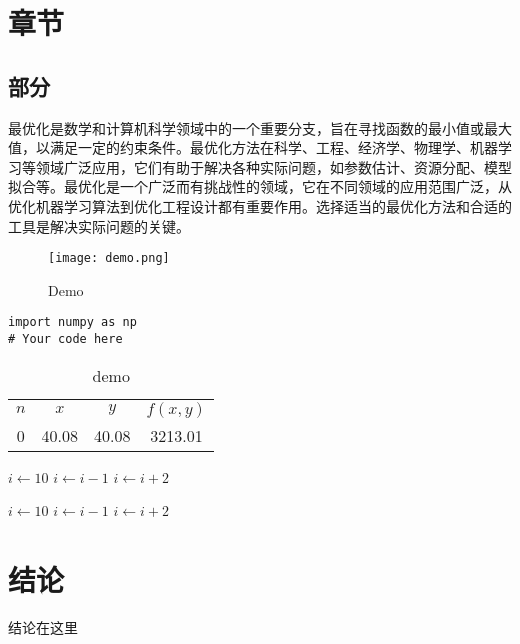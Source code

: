 
\iffalse
\fi

\chapter{章节}

\section{部分}

最优化\cite{optim}是数学和计算机科学领域中的一个重要分支，旨在寻找函数的最小值或最大值，以满足一定的约束条件。最优化方法在科学、工程、经济学、物理学、机器学习等领域广泛应用，它们有助于解决各种实际问题，如参数估计、资源分配、模型拟合等。最优化是一个广泛而有挑战性的领域，它在不同领域的应用范围广泛，从优化机器学习算法到优化工程设计都有重要作用。选择适当的最优化方法和合适的工具是解决实际问题的关键。

\begin{figure}[H]
\centering
\texttt{[image: demo.png]}
\caption{Demo}\label{fig:demo}
\vspace{-1em}
\end{figure}


\begin{lstlisting}
import numpy as np
# Your code here
\end{lstlisting}


\begin{table}[H]
\caption{demo}\label{tab:demo}
\vspace{0.5em}\centering\wuhao
\begin{tabular}{cccc}
\toprule[1.5pt]
$n$ & $x$ & $y$ & $f(x, y)$\\
0 & 40.08 & 40.08 & 3213.01 \\
\midrule[1pt]
\bottomrule[1.5pt]
\end{tabular}
\vspace{\baselineskip}
\end{table}


\begin{algorithm}
    $i\gets 10$\;
    {
        $i\gets i-1$\;
    }
    {
        {
            $i\gets i+2$\;
        }
    }
\end{algorithm}


\begin{algorithmic}
    \STATE $i\gets 10$
      \STATE $i\gets i-1$
    \ELSE
        \STATE $i\gets i+2$
      \ENDIF
    \ENDIF 
\end{algorithmic}



\chapter*{结\quad 论}
    
结论在这里



